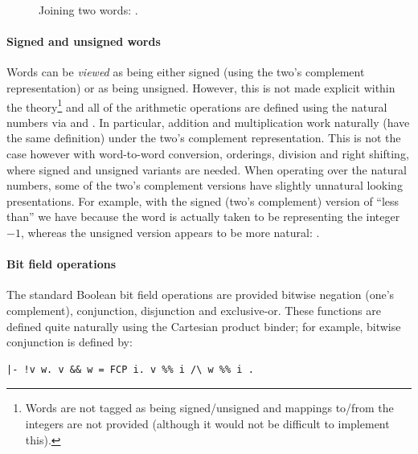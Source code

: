{\begin{figure}
\begin{center}
\caption{Joining two words: .}
\label{fig:concat}
\end{center}
\end{figure}

\paragraph{Signed and unsigned words}

Words can be \emph{viewed} as being either signed (using the two's complement 
representation) or as being unsigned.  However, this is not made explicit 
within the theory\footnote{Words are not tagged as being signed/unsigned and 
mappings to/from the integers are not provided (although it would not be 
difficult to implement this).} and all of the arithmetic operations are defined 
using the natural numbers \ie{} via  and .  In 
particular, addition and multiplication work naturally (have the same 
definition) under the two's complement representation.  This is not the case 
however with word-to-word conversion, orderings, division and right shifting, 
where signed and unsigned variants are needed.  When operating over the natural 
numbers, some of the two's complement versions have slightly unnatural looking 
presentations.  For example, with the signed (two's complement) version of 
``less than'' we have  because the word   is actually taken to be representing the integer $-1$, whereas the 
unsigned version appears to be more natural: .

\paragraph{Bit field operations}

The standard Boolean bit field operations are provided \ie{} bitwise negation 
(one's complement), conjunction, disjunction and exclusive-or.  These functions 
are defined quite naturally using the Cartesian product binder; for example, 
bitwise conjunction is defined by:
\begin{hol}
\begin{verbatim}
|- !v w. v && w = FCP i. v %% i /\ w %% i .
\end{verbatim}
\end{hol}

}
